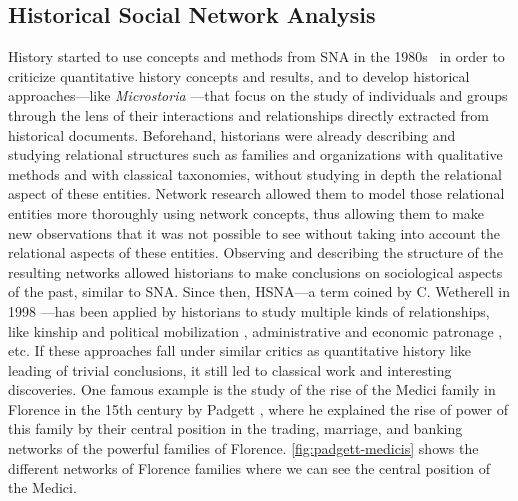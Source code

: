 \subsection{Historical Social Network Analysis}\label{subsec:historical-social-network-analsyis}

History started to use concepts and methods from SNA in the 1980s~\cite{wetherellHistoricalSocialNetwork1998} in order to criticize quantitative history concepts and results,
and to develop historical approaches---like \textit{Microstoria} \cite{ginzburgMicrohistoire1981}---that focus on the study of individuals and groups through the lens of their interactions and relationships directly extracted from historical documents.
Beforehand, historians were already describing and studying relational structures such as families and organizations with qualitative methods and with classical taxonomies, without studying in depth the relational aspect of these entities.
Network research allowed them to model those relational entities more thoroughly using network concepts, thus allowing them to make new observations that it was not possible to see without taking into account the relational aspects of these entities.
Observing and describing the structure of the resulting networks allowed historians to make conclusions on sociological aspects of the past, similar to SNA.
Since then, HSNA---a term coined by C. Wetherell in 1998 \cite{wetherellHistoricalSocialNetwork1998}---has been applied by historians to study multiple kinds of relationships, like kinship and political mobilization \cite{lippKinshipNetworksLocal2005}, administrative and economic patronage \cite{moutoukias1992}, etc.
If these approaches fall under similar critics as quantitative history \cite{lemercier12FormalNetwork2015} like leading of trivial conclusions, it still led to classical work and interesting discoveries.
One famous example is the study of the rise of the Medici family in Florence in the 15th century by Padgett \cite{padgettRobustActionRise1993}, where he explained the rise of power of this family by their central position in the trading, marriage, and banking networks of the powerful families of Florence. \autoref{fig:padgett-medicis} shows the different networks of Florence families where we can see the central position of the Medici.

